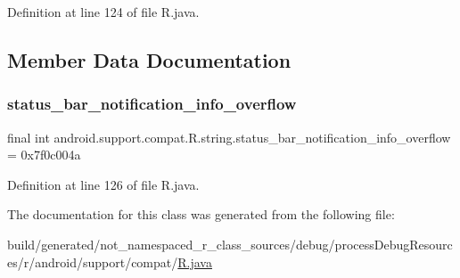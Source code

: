 Definition at line 124 of file R.\+java.


\begin{DoxyCode}{0}

\end{DoxyCode}


\subsection{Member Data Documentation}
\mbox{\label{classandroid_1_1support_1_1compat_1_1_r_1_1string_a7529efba925b9ba0a8d7ae1cab99f9db}} 
\subsubsection{\texorpdfstring{status\_bar\_notification\_info\_overflow}{status\_bar\_notification\_info\_overflow}}
{\footnotesize\ttfamily final int android.\+support.\+compat.\+R.\+string.\+status\+\_\+bar\+\_\+notification\+\_\+info\+\_\+overflow = 0x7f0c004a\hspace{0.3cm}{\ttfamily [static]}}



Definition at line 126 of file R.\+java.



The documentation for this class was generated from the following file\+:\begin{DoxyCompactItemize}
\item 
build/generated/not\+\_\+namespaced\+\_\+r\+\_\+class\+\_\+sources/debug/process\+Debug\+Resources/r/android/support/compat/\mbox{\hyperlink{android_2support_2compat_2_r_8java}{R.\+java}}\end{DoxyCompactItemize}
